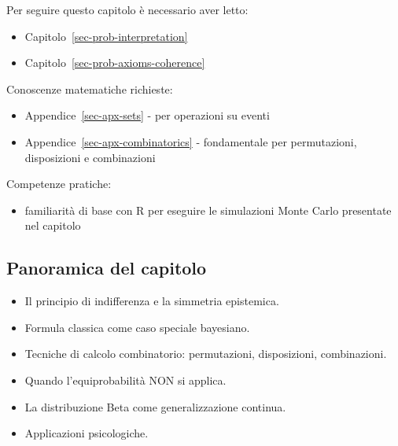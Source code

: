 \documentclass[
  italian,
  letterpaper,
  a4paper,
  11pt,
  open=any]{scrbook}
\providecommand{\tightlist}{%
  \setlength{\itemsep}{0pt}\setlength{\parskip}{0pt}}
\theoremstyle{plain}
\theoremstyle{definition}
\theoremstyle{definition}
\theoremstyle{remark}
\begin{document}
\begin{tcolorbox}[enhanced jigsaw, arc=.35mm, bottomrule=.15mm, bottomtitle=1mm, breakable, colback=white, colbacktitle=quarto-callout-tip-color!10!white, colframe=quarto-callout-tip-color-frame, coltitle=black, left=2mm, leftrule=.75mm, opacityback=0, opacitybacktitle=0.6, rightrule=.15mm, title=\textcolor{quarto-callout-tip-color}{\faLightbulb}\hspace{0.5em}{Prerequisiti}, titlerule=0mm, toprule=.15mm, toptitle=1mm]

Per seguire questo capitolo è necessario aver letto:

\begin{itemize}
\tightlist
\item
  Capitolo~\ref{sec-prob-interpretation}
\item
  Capitolo~\ref{sec-prob-axioms-coherence}
\end{itemize}

Conoscenze matematiche richieste:

\begin{itemize}
\tightlist
\item
  Appendice~\ref{sec-apx-sets} - per operazioni su eventi
\item
  Appendice~\ref{sec-apx-combinatorics} - fondamentale per permutazioni,
  disposizioni e combinazioni
\end{itemize}

Competenze pratiche:

\begin{itemize}
\tightlist
\item
  familiarità di base con R per eseguire le simulazioni Monte Carlo
  presentate nel capitolo
\end{itemize}

\end{tcolorbox}

\subsection*{Panoramica del capitolo}\label{panoramica-del-capitolo-1}

\begin{itemize}
\tightlist
\item
  Il principio di indifferenza e la simmetria epistemica.
\item
  Formula classica come caso speciale bayesiano.
\item
  Tecniche di calcolo combinatorio: permutazioni, disposizioni,
  combinazioni.
\item
  Quando l'equiprobabilità NON si applica.
\item
  La distribuzione Beta come generalizzazione continua.
\item
  Applicazioni psicologiche.
\end{itemize}
\end{document}
